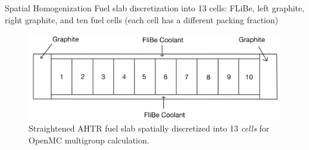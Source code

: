 \begin{frame}
    \begin{block}{Spatial Homogenization}
        Fuel slab discretization into 13 cells: FLiBe, left graphite, right graphite, 
        and ten fuel cells (each cell has a different packing fraction)
    \end{block}
    \begin{figure}[]
        \includegraphics[width=0.8\linewidth]{figures/straightened_slab_mg.png}
        \caption{Straightened AHTR fuel slab spatially discretized into 
        13 \textit{cells} for OpenMC multigroup calculation.}
    \end{figure}

\end{frame}